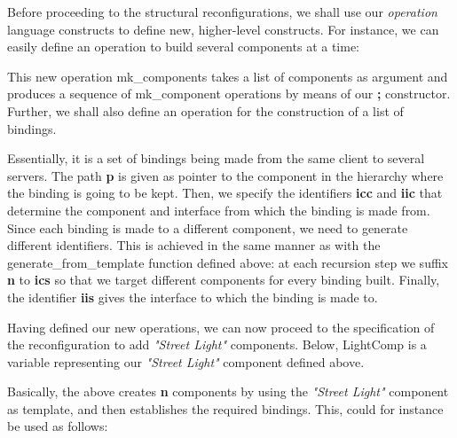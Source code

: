     
  Before proceeding to the structural reconfigurations, we 
  shall use our \textit{operation} language 
  constructs to define new,
  higher-level constructs. For instance, we can easily define an \textsf{operation}
  to build several \textsf{component}s at a time:
  
  		
 
\noindent This new \textsf{operation} \textsf{mk\_components} takes
a list of \textsf{component}s as argument and produces a sequence of
\textsf{mk\_component} \textsf{operation}s by means of our 
\textbf{;} constructor. Further, we shall also define an \textsf{operation}
for the construction of a list of \textsf{binding}s.
 
 

\noindent %

Essentially, it is 
a set of \textsf{binding}s being made from the same client to several
servers. The path \textbf{p} is given as pointer to the \textsf{component} in the hierarchy
where the \textsf{binding} is going to be kept. Then,  we specify the identifiers \textbf{icc}
and \textbf{iic} that determine the \textsf{component} and \textsf{interface} from which the
\textsf{binding} is made from. Since each \textsf{binding} is made to a different \textsf{component},
we need to generate different identifiers. This is achieved in the same manner
as with the \textsf{generate\_from\_template} function defined above: at each
recursion step we suffix \textbf{n} to \textbf{ics} so that we target different \textsf{component}s
for every \textsf{binding} built. Finally, the identifier \textbf{iis} gives the \textsf{interface} to 
which the \textsf{binding} is made to.
 
Having defined our new \textsf{operation}s, we can now proceed to the specification
of the reconfiguration to add \textit{"Street Light"} \textsf{component}s. Below, \textsf{LightComp}
is a variable representing our \textit{"Street Light"} \textsf{component} defined above.
 

 
\noindent Basically, the above creates \textbf{n} \textsf{component}s
by using the \textit{"Street Light"} \textsf{component} as template, and 
then establishes the required \textsf{binding}s. This, could for instance be
used as follows:

